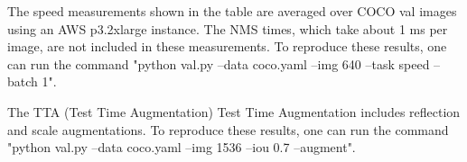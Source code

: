 \begin{itemize}
\begin{table}[h]
The speed measurements shown in the table are averaged over COCO val images using an AWS p3.2xlarge instance. The NMS times, which take about 1 ms per image, are not included in these measurements. To reproduce these results, one can run the command "python val.py --data coco.yaml --img 640 --task speed --batch 1".\cite{U23}

The TTA (Test Time Augmentation) Test Time Augmentation includes reflection and scale augmentations. To reproduce these results, one can run the command "python val.py --data coco.yaml --img 1536 --iou 0.7 --augment".\cite{U23}
\end{table}

\FloatBarrier
\FloatBarrier
  
\vspace{0.5cm}




\end{itemize}
